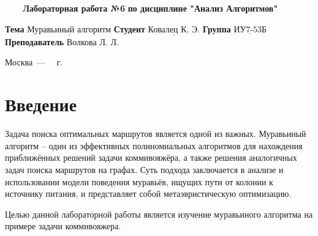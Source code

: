 \documentclass[a4paper,14pt, unknownkeysallowed]{extreport}
\begin{document}
\begin{titlepage}
	
	\begin{center}
		\noindent\begin{minipage}{1.3\textwidth}\centering
		\Large\textbf{   ~~~ Лабораторная работа №6}\newline
		\textbf{по дисциплине "Анализ Алгоритмов"}\newline\newline\newline
		\end{minipage}
	\end{center}
	
	\noindent\textbf{Тема} 			$\underline{\text{Муравьиный алгоритм}}$\newline\newline
	\noindent\textbf{Студент} 		$\underline{\text{Ковалец К. Э.}}$\newline\newline
	\noindent\textbf{Группа} 		$\underline{\text{ИУ7-53Б}}$\newline\newline
	\noindent\textbf{Преподаватель} $\underline{\text{Волкова Л. Л.}}$\newline
	
	\begin{center}
		\vfill
		Москва~---~\the\year
		~г.
	\end{center}
	\restoregeometry
\end{titlepage}



\renewcommand{\contentsname}{Содержание} 
\tableofcontents
\setcounter{page}{2}





\chapter*{Введение}

Задача поиска оптимальных маршрутов является одной из важных.
Муравьиный алгоритм – один из эффективных полиномиальных алгоритмов для нахождения приближённых решений задачи коммивояжёра, а также решения аналогичных задач поиска маршрутов на графах. Суть подхода заключается в анализе и использовании модели поведения муравьёв, ищущих пути от колонии к источнику питания, и представляет собой метаэвристическую оптимизацию.

Целью данной лабораторной работы является изучение муравьиного алгоритма на примере задачи коммивояжера.
\end{document}
